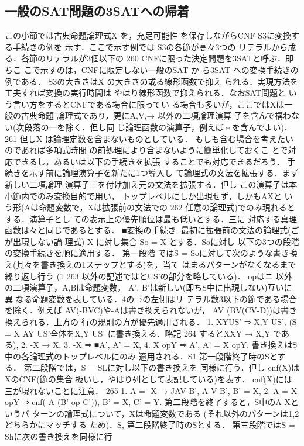 \documentclass{ltjsarticle}
\theoremstyle{mystyle1}
\theoremstyle{mystyle3}
\theoremstyle{mystyle2}
\begin{document}
\subsection{一般のSAT問題の3SATへの帰着}
この小節では古典命題論理式X を，充足可能性 を保存しながらCNF S3に変換する手続きの例を 示す．ここで示す例では S3の各節が高々3つの リテラルから成る．各節のリテラルが3個以下の
260
CNFに限った決定問題を3SATと呼ぶ．即ちこ こで示すのは，CNFに限定しない一般のSAT か ら3SAT への変換手続きの例である． S3の大きさはX の大きさの或る線形函数で抑え られる．実現方法を工夫すれば変換の実行時間は やはり線形函数で抑えられる．なおSAT問題と いう言い方をするとCNFである場合に限ってい る場合も多いが，ここではXは一般の古典命題 論理式であり，更にA,V,→ 以外の二項論理演算 子を含んで構わない(次段落の一を除く．但し同 じ論理函数の演算子，例えば⇔を含んでよい)．
261
但しX は論理定数を含まないものとしている． もしも含む場合を考えたいのであれば多項式時間 の前処理により含まないように簡単化しておくこ とで対応できるし，あるいは以下の手続きを拡張 することでも対応できるだろう． 手続きを示す前に論理演算子を新たに1つ導入し て論理式の文法を拡張する．まず新しい二項論理 演算子三を付け加え元の文法を拡張する．但し この演算子は本小節内でのみ変換目的で用い， トップレベルにしか出現せず，しかもAXと いう形(Aは命題変数で，Xは拡張前の文法での
262
任意の論理式)でのみ現れるとする．演算子とし ての表示上の優先順位は最も低いとする．三に 対応する真理函数は々と同じであるとする．
■変換の手続き: 最初に拡張前の文法の論理式(ごが出現しない論 理式) X に対し集合 So = {X} とする．Soに対し 以下の3つの段階の変換手続きを順に適用する． 第一段階 ではS = Soに対して次のような書き換 え(其々を書き換えの1ステップとする)を，当て はまるパターンがなくなるまで繰り返し行う (1
263
以外の記述では{と}US'の部分を略している)． opはニ 以外の二項演算子，A,Bは命題変数， A', B'は新しい(即ちS中に出現しない)互いに異 なる命題変数を表している．4の→の左側はリ テラル数3以下の節である場合を除く．例えば AV(-BVC)や-Aは書き換えられないが， AV (BV(CV-D))は書き換えられる．上方の 行の規則の方が優先適用される．
1. {XY}US' ⇒ {X,Y} US', (S = {X AY
}US'全体を{X,Y} US' に書き換える．略記
264
するとXXY → X,Y である), 2. -X → X, 3. -X ⇒ ■A', A' = X, 4. X opY ⇒ A', A' = X opY. 書き換えはS中の各論理式のトップレベルにのみ 適用される．S1 第一段階終了時のSとする． 第二段階では，S = SLに対し以下の書き換えを 同様に行う．但し cnf(X)はXのCNF(節の集合 扱いし，やはり列として表記している)を表す． cnf(X)には三が現れないことに注意．
265
1. A = -X → JAV-B', A V B', B' = X, 2. A = X opY ⇒
cnf( A (B' op C')), B' = X, C' = Y. 第二段階を終了すると，S中のA Xというパ ターンの論理式について，Xは命題変数である (それ以外のパターンは1,2どちらかにマッチする ため)．S, 第二段階終了時のSとする． 第三段階ではS = Shに次の書き換えを同様に行
\end{document}
